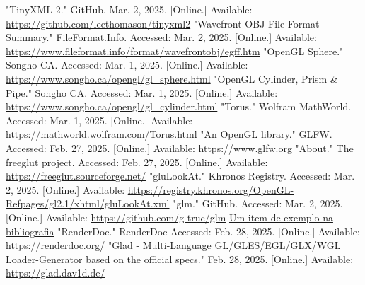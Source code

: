 \documentclass[12pt, a4paper]{article}
\begin{document}
\begin{thebibliography}{9}
        "TinyXML-2."{} GitHub. Mar. 2, 2025. [Online.] Available:
        \url{https://github.com/leethomason/tinyxml2}
        "Wavefront OBJ File Format Summary."{} FileFormat.Info. Accessed: Mar. 2, 2025. [Online.]
        Available: \url{https://www.fileformat.info/format/wavefrontobj/egff.htm}
        "OpenGL Sphere."{} Songho CA. Accessed: Mar. 1, 2025. [Online.] Available:
        \url{https://www.songho.ca/opengl/gl_sphere.html}
        "OpenGL Cylinder, Prism \& Pipe."{} Songho CA. Accessed: Mar. 1, 2025. [Online.] Available:
        \url{https://www.songho.ca/opengl/gl_cylinder.html}
        "Torus."{} Wolfram MathWorld. Accessed: Mar. 1, 2025. [Online.] Available:
        \url{https://mathworld.wolfram.com/Torus.html}
        "An OpenGL library."{} GLFW. Accessed: Feb. 27, 2025. [Online.] Available:
        \url{https://www.glfw.org}
        "About."{} The freeglut project. Accessed: Feb. 27, 2025. [Online.] Available:
        \url{https://freeglut.sourceforge.net/}
        "gluLookAt."{} Khronos Registry. Accessed: Mar. 2, 2025. [Online.] Available:
        \url{https://registry.khronos.org/OpenGL-Refpages/gl2.1/xhtml/gluLookAt.xml}
        "glm."{} GitHub. Accessed: Mar. 2, 2025. [Online.] Available:
        \url{https://github.com/g-truc/glm}
        \href{https://youtu.be/dQw4w9WgXcQ}{Um item de exemplo na bibliografia}
        "RenderDoc."{} RenderDoc Accessed: Feb. 28, 2025. [Online.] Available:
        \url{https://renderdoc.org/}
        "Glad - Multi-Language GL/GLES/EGL/GLX/WGL Loader-Generator based on the official specs."{}
        Feb. 28, 2025. [Online.] Available: \url{https://glad.dav1d.de/}
\end{thebibliography}
\endgroup
\end{document}

